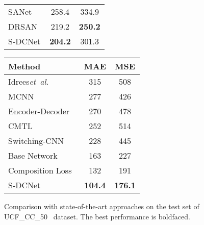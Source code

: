 \documentclass[10pt,twocolumn,letterpaper]{article}
\begin{document}
\begin{figure*}
\begin{minipage}{\textwidth}
\begin{minipage}{.25\textwidth}
\begin{tabular}{|l|c|c|}
					SANet~\cite{SANet_2018_ECCV}&258.4	&334.9\\
					DRSAN~\cite{DRSAN2018Crowd}&219.2	&\textbf{250.2}\\
\hline
					S-DCNet & \textbf{204.2} & 301.3\\
					
					\hline
				\end{tabular}
				\vspace{0pt}
				\caption{Comparison with state-of-the-art approaches on the test set of UCF\_CC\_50~\cite{UCFCC50_2013_CVPR} dataset. The best performance is boldfaced.\newline}
				\label{tab:compare_UCF_CC}    
			\end{minipage}
			\hfill
\makeatletter{}\makeatother
			\begin{minipage}{.30\textwidth}
				\centering
				\footnotesize
				\begin{tabular}{|l|c|c|}
					\hline
					Method & MAE &MSE\\
					\hline
					Idrees\textit{et~al.}~\cite{UCFCC50_2013_CVPR}&315&508\\
					MCNN~\cite{MCNN_2016_CVPR}&277&426\\
					Encoder-Decoder~\cite{En_De2017segnet}& 270 &478\\
					CMTL~\cite{CMTL2017CNN}&252&514\\
					Switching-CNN~\cite{SwitchCNN_2017_CVPR}&228&445\\
					Base Network~\cite{Compose_Loss_2018_ECCV}& 163& 227\\
					Composition Loss~\cite{Compose_Loss_2018_ECCV}&132&191\\
					\hline
					S-DCNet & \textbf{104.4}&\textbf{176.1}	\\
					

\end{tabular}
\end{minipage}
\end{minipage}
\end{figure*}
\end{document}

